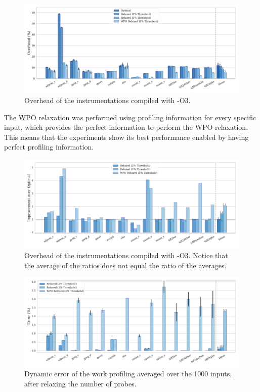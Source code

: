\begin{figure}[ht]
    \centering
    \includegraphics[width=\textwidth]{figs/overhead-O3.pdf}
    \caption{Overhead of the instrumentations compiled with {\flagstype -O3}.}
    \label{fig:overhead-O3}
\end{figure}

The WPO relaxation was performed using profiling information for every specific input, which provides the perfect information to perform the WPO relaxation.
This means that the experiments show its best performance enabled by having perfect profiling information.

\begin{figure}[ht]
    \centering
    \includegraphics[width=\textwidth]{figs/overhead-improvement-O3.pdf}
    \caption{Overhead of the instrumentations compiled with {\flagstype -O3}.
             Notice that the average of the ratios does not equal the ratio of the averages.}
    \label{fig:overhead-improvement-O3}
\end{figure}

\begin{figure}[h!]
    \centering
    \includegraphics[width=\textwidth]{figs/error-O3.pdf}
    \caption{Dynamic error of the work profiling averaged over the 1000 inputs, after relaxing the number of probes.}
    \label{fig:error-O3}
\end{figure}

